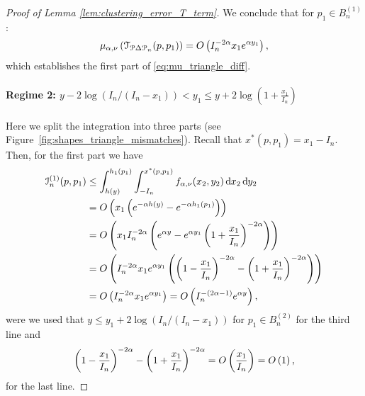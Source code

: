 \begin{proof}[Proof of Lemma \ref{lem:clustering_error_T_term}]
We conclude that for $p_1 \in B_n^{(1)}$:
\[
	\mu_{\alpha, \nu}\left(\mathcal{T}_{{\mathcal P} \Delta {\mathcal P}_n}(p,p_1)\right) = O\left(I_n^{-2\alpha} x_1 e^{\alpha y_1}\right),
\]
which establishes the first part of \eqref{eq:mu_triangle_diff}.

\paragraph{Regime 2: $y - 2\log(I_n/(I_n-x_1)) < y_1 \le y + 2 \log\left(1 + \frac{x_1}{I_n}\right)$}

Here we split the integration into three parts (see Figure~\ref{fig:shapes_triangle_mismatches}). Recall that $x^\ast(p,p_1) = x_1 - I_n$. Then, for the first part we have
\begin{align*}
	\mathcal{I}_n^{(1)}(p,p_1) &\le \int_{h(y)}^{h_1(p_1)} \int_{-I_n}^{x^\ast(p,p_1)} f_{\alpha,\nu}(x_2, y_2) 
		\operatorname{\mathrm{d}\hspace{-2pt}} x_2 \operatorname{\mathrm{d}\hspace{-2pt}} y_2\\
	&= O\left(x_1 \left(e^{-\alpha h(y)} - e^{-\alpha h_1(p_1)}\right)\right)\\
	&= O\left(x_1 I_n^{-2\alpha}\left(e^{\alpha y} - e^{\alpha y_1}\left(1 + \frac{x_1}{I_n}\right)^{-2\alpha}\right)\right)\\
	&= O\left(I_n^{-2\alpha} x_1 e^{\alpha y_1}\left(\left(1 - \frac{x_1}{I_n}\right)^{-2\alpha} 
		- \left(1 + \frac{x_1}{I_n}\right)^{-2\alpha}\right)\right)\\
	&= O\left(I_n^{-2\alpha} x_1 e^{\alpha y_1}\right) = O\left(I_n^{-(2\alpha - 1)} e^{\alpha y}\right), 
\end{align*}
were we used that $y \le y_1 + 2\log(I_n/(I_n-x_1))$ for $p_1 \in B_n^{(2)}$ for the third line and 
\[
	\left(1 - \frac{x_1}{I_n}\right)^{-2\alpha} - \left(1 + \frac{x_1}{I_n}\right)^{-2\alpha}
	= O\left(\frac{x_1}{I_n}\right) = O\left(1\right),
\]
for the last line.


\end{proof}

